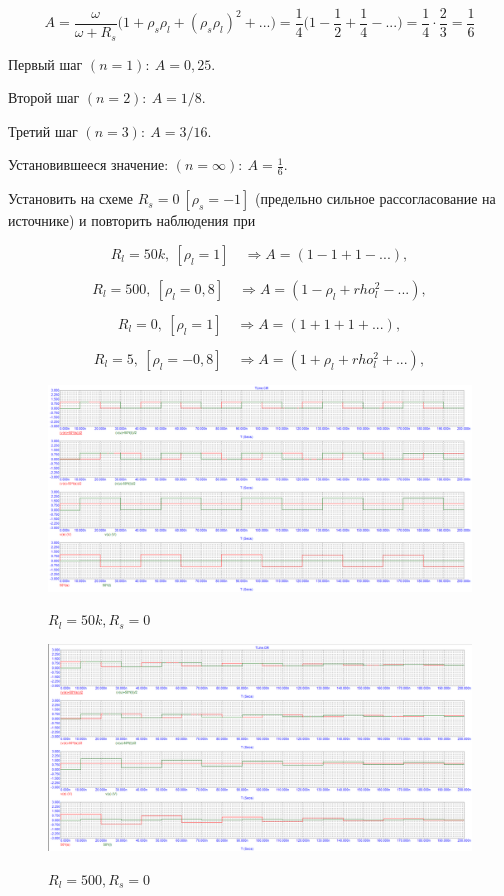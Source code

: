\documentclass[a4paper, 12pt]{article}%
\begin{document}
\[A = \frac{\omega}{\omega + R_s} \Big( 1 + \rho_s \rho_l + (\rho_s \rho_l)^2 + ...\Big) = \frac{1}{4} \Big( 1 - \frac{1}{2} + \frac{1}{4} - ... \Big) = \frac{1}{4} \cdot \frac{2}{3} = \frac{1}{6}\]

Первый шаг $(n = 1): \: A = 0,25$.

Второй шаг $(n = 2): \: A = 1/8$.

Третий шаг $(n = 3): \: A = 3/16$.

Установившееся значение: $(n = \infty): \: A = \frac{1}{6}$.

Установить на схеме $R_s = 0 \: [\rho_s = -1]$ (предельно сильное рассогласование на источнике) и повторить наблюдения при

\[R_l = 50k, \: [\rho_l = 1] \quad \Rightarrow A = (1 -1 +1 -...),\]

\[R_l = 500, \: [\rho_l = 0,8] \quad \Rightarrow A = (1 -\rho_l + rho_l^2 -...),\]

\[R_l = 0, \: [\rho_l = 1] \quad \Rightarrow A = (1 +1 +1 +...),\]

\[R_l = 5, \: [\rho_l = -0,8] \quad \Rightarrow A = (1 +\rho_l + rho_l^2 +...),\]

\begin{figure}[h!]
\centering
\includegraphics[scale=0.4]{images/Graph11.png}
\label{fig:Image1}
\caption{$R_l = 50k, R_s = 0$}
\end{figure}

\begin{figure}[h!]
\centering
\includegraphics[scale=0.4]{images/Graph12.png}
\label{fig:Image1}
\caption{$R_l = 500, R_s = 0$}
\end{figure}
\end{document}
